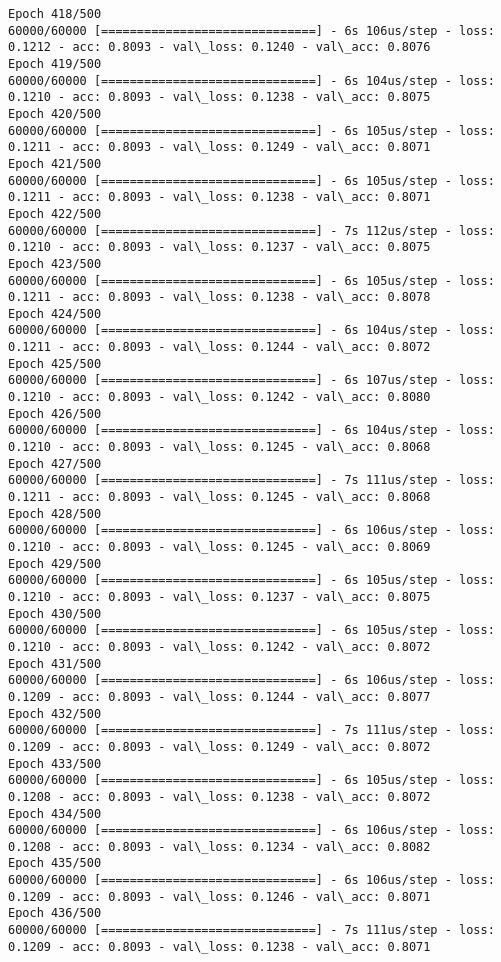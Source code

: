 \documentclass[11pt]{article}
\begin{document}
\begin{Verbatim}[commandchars=\\\{\}]
Epoch 418/500
60000/60000 [==============================] - 6s 106us/step - loss: 0.1212 - acc: 0.8093 - val\_loss: 0.1240 - val\_acc: 0.8076
Epoch 419/500
60000/60000 [==============================] - 6s 104us/step - loss: 0.1210 - acc: 0.8093 - val\_loss: 0.1238 - val\_acc: 0.8075
Epoch 420/500
60000/60000 [==============================] - 6s 105us/step - loss: 0.1211 - acc: 0.8093 - val\_loss: 0.1249 - val\_acc: 0.8071
Epoch 421/500
60000/60000 [==============================] - 6s 105us/step - loss: 0.1211 - acc: 0.8093 - val\_loss: 0.1238 - val\_acc: 0.8071
Epoch 422/500
60000/60000 [==============================] - 7s 112us/step - loss: 0.1210 - acc: 0.8093 - val\_loss: 0.1237 - val\_acc: 0.8075
Epoch 423/500
60000/60000 [==============================] - 6s 105us/step - loss: 0.1211 - acc: 0.8093 - val\_loss: 0.1238 - val\_acc: 0.8078
Epoch 424/500
60000/60000 [==============================] - 6s 104us/step - loss: 0.1211 - acc: 0.8093 - val\_loss: 0.1244 - val\_acc: 0.8072
Epoch 425/500
60000/60000 [==============================] - 6s 107us/step - loss: 0.1210 - acc: 0.8093 - val\_loss: 0.1242 - val\_acc: 0.8080
Epoch 426/500
60000/60000 [==============================] - 6s 104us/step - loss: 0.1210 - acc: 0.8093 - val\_loss: 0.1245 - val\_acc: 0.8068
Epoch 427/500
60000/60000 [==============================] - 7s 111us/step - loss: 0.1211 - acc: 0.8093 - val\_loss: 0.1245 - val\_acc: 0.8068
Epoch 428/500
60000/60000 [==============================] - 6s 106us/step - loss: 0.1210 - acc: 0.8093 - val\_loss: 0.1245 - val\_acc: 0.8069
Epoch 429/500
60000/60000 [==============================] - 6s 105us/step - loss: 0.1210 - acc: 0.8093 - val\_loss: 0.1237 - val\_acc: 0.8075
Epoch 430/500
60000/60000 [==============================] - 6s 105us/step - loss: 0.1210 - acc: 0.8093 - val\_loss: 0.1242 - val\_acc: 0.8072
Epoch 431/500
60000/60000 [==============================] - 6s 106us/step - loss: 0.1209 - acc: 0.8093 - val\_loss: 0.1244 - val\_acc: 0.8077
Epoch 432/500
60000/60000 [==============================] - 7s 111us/step - loss: 0.1209 - acc: 0.8093 - val\_loss: 0.1249 - val\_acc: 0.8072
Epoch 433/500
60000/60000 [==============================] - 6s 105us/step - loss: 0.1208 - acc: 0.8093 - val\_loss: 0.1238 - val\_acc: 0.8072
Epoch 434/500
60000/60000 [==============================] - 6s 106us/step - loss: 0.1208 - acc: 0.8093 - val\_loss: 0.1234 - val\_acc: 0.8082
Epoch 435/500
60000/60000 [==============================] - 6s 106us/step - loss: 0.1209 - acc: 0.8093 - val\_loss: 0.1246 - val\_acc: 0.8071
Epoch 436/500
60000/60000 [==============================] - 7s 111us/step - loss: 0.1209 - acc: 0.8093 - val\_loss: 0.1238 - val\_acc: 0.8071

\end{Verbatim}
\end{document}
